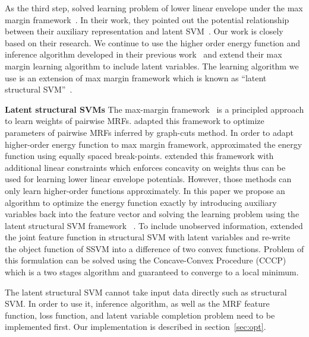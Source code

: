 \documentclass[sigconf]{acmart}
\renewcommand{\citename}{\citet}
\renewcommand{\cite}{\citep}
\begin{document}
As the third step, \citename{gouldlearning} solved
learning problem of lower linear envelope under the max
margin framework~\cite{tsochantaridis2005large}. In their work, 
they pointed out the potential relationship between their
auxiliary representation and latent SVM~\cite{yu2009learning}.
Our work is closely based on their research. We continue to use
the higher order energy function and inference algorithm
developed in their previous work~\cite{Gould:ICML2011} and extend
their max margin learning algorithm to include latent variables.
The learning algorithm we use is an extension of max margin
framework which is known as ``latent structural
SVM''~\cite{yu2009learning}.

\textbf{Latent structural SVMs} The max-margin
framework~\cite{Taskar:ICML05,tsochantaridis2005large} is a
principled approach to learn weights of pairwise MRFs.
\citename{Szummer:ECCV08} adapted this framework to optimize
parameters of pairwise MRFs inferred by graph-cuts method. In
order to adapt higher-order energy function to max margin
framework, \citename{Gould:ICML2011} approximated the energy
function using equally spaced break-points.
\citename{gouldlearning} extended this framework with additional
linear constraints which enforces concavity on weights thus can
be used for learning lower linear envelope potentials. However,
those methods can only learn higher-order functions
approximately. In this paper we propose an algorithm to optimize
the energy function exactly by introducing auxiliary variables
back into the feature vector and solving the learning problem
using the latent structural SVM framework
~\cite{yu2009learning}. To include unobserved information,
\citename{yu2009learning} extended the joint feature function in
structural SVM with latent variables and re-write the object
function of SSVM into a difference of two convex functions.
Problem of this formulation can be solved using the
Concave-Convex Procedure (CCCP)\cite{yuille2002concave} which is
a two stages algorithm and guaranteed to converge to a local
minimum.


The latent structural SVM cannot take input data directly such
as structural SVM. In order to use it, inference algorithm, as
well as the MRF feature function, loss function, and latent
variable completion problem\cite{yu2009learning} need to be
implemented first. Our implementation is described in
section~\ref{sec:opt}.
\end{document}
